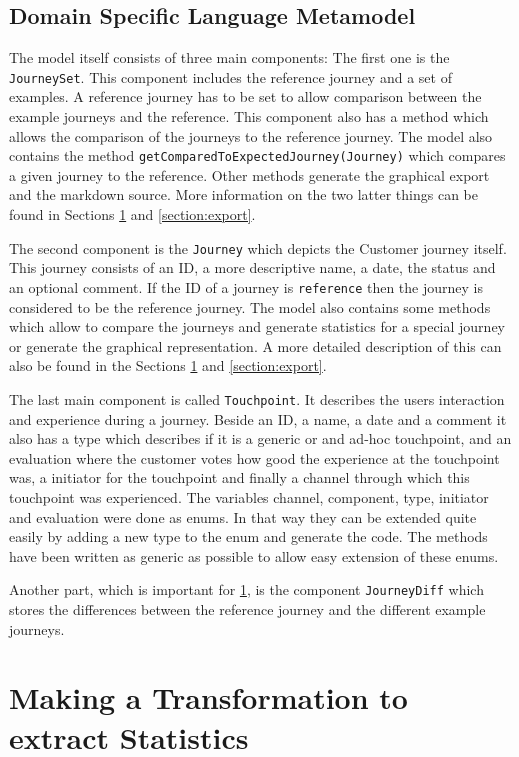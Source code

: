 \documentclass[12pt]{scrartcl}
\begin{document}
\subsection{Domain Specific Language Metamodel}
The model itself consists of three main components: The first one is the \lstinline!JourneySet!. This component
includes the reference journey and a set of examples. A reference journey has to be set to allow comparison
between the example journeys and the reference. This component also has a method which allows the comparison
of the journeys to the reference journey. The model also contains the method \lstinline!getComparedToExpectedJourney(Journey)!
which compares a given journey to the reference. Other methods generate the graphical export and the markdown source. More
information on the two latter things can be found in Sections \ref{section:statistic} and \ref{section:export}.

The second component is the \lstinline!Journey! which depicts the Customer journey itself. This journey consists of 
an ID, a more descriptive name, a date, the status and an optional comment. If the ID of a journey is 
\lstinline!reference! then the journey is considered to be the reference journey. The model also contains some 
methods which allow to compare the journeys and generate statistics for a special journey or generate the graphical
representation. A more detailed description of this can also be found in the Sections \ref{section:statistic} and
\ref{section:export}.

The last main component is called \lstinline!Touchpoint!. It describes the users interaction and experience during
a journey. Beside an ID, a name, a date and a comment it also has a type which describes if it is a generic or
and ad-hoc touchpoint, and an evaluation where the customer votes how good the experience at the touchpoint was, a 
initiator for the touchpoint and finally a channel through which this touchpoint was experienced. The variables
channel, component, type, initiator and evaluation were done as enums. In that way they can be extended quite
easily by adding a new type to the enum and generate the code. The methods have been written as generic as possible
to allow easy extension of these enums.

Another part, which is important for \ref{section:statistic}, is the component \lstinline!JourneyDiff! which stores
the differences between the reference journey and the different example journeys.

\section{Making a Transformation to extract Statistics} 
\label{section:statistic}
\end{document}
